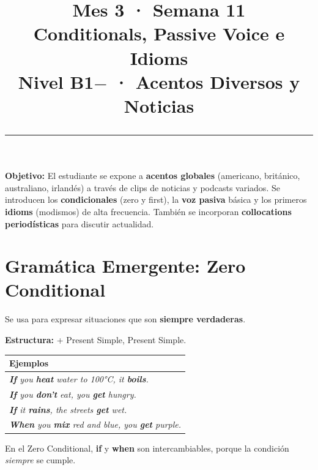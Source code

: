 \documentclass[12pt,a4paper]{article}
\title{%
  \vspace{-1cm}
  {\Huge\bfseries\textcolor{mes3}{Mes 3 · Semana 11}}\\[0.3cm]
  {\Large Conditionals, Passive Voice e Idioms}\\[0.2cm]
  {\large\color{grissuave} Nivel B1$-$ · Acentos Diversos y Noticias}\\[0.5cm]
  \rule{\textwidth}{1.5pt}
}
\author{}
\date{}
\begin{document}
\maketitle
\thispagestyle{empty}

\begin{cajanivel}
\textbf{Objetivo:} El estudiante se expone a \textbf{acentos globales} (americano, británico, australiano, irlandés) a través de clips de noticias y podcasts variados. Se introducen los \textbf{condicionales} (zero y first), la \textbf{voz pasiva} básica y los primeros \textbf{idioms} (modismos) de alta frecuencia. También se incorporan \textbf{collocations periodísticas} para discutir actualidad.
\end{cajanivel}

\section{Gramática Emergente: Zero Conditional}

\begin{cajagrammar}
Se usa para expresar situaciones que son \textbf{siempre verdaderas}.

\medskip
\textbf{Estructura:}  + Present Simple, Present Simple.

\begin{tabularx}{\textwidth}{@{} X @{}}
\toprule
\textbf{Ejemplos} \\
\midrule
\textit{\textbf{If} you \textbf{heat} water to 100°C, it \textbf{boils}.} \\
\textit{\textbf{If} you \textbf{don't} eat, you \textbf{get} hungry.} \\
\textit{\textbf{If} it \textbf{rains}, the streets \textbf{get} wet.} \\
\textit{\textbf{When} you \textbf{mix} red and blue, you \textbf{get} purple.} \\
\bottomrule
\end{tabularx}

\medskip
\begin{cajaejemplo}[Nota]
En el Zero Conditional, \textbf{if} y \textbf{when} son intercambiables, porque la condición \textit{siempre} se cumple.
\end{cajaejemplo}
\end{cajagrammar}
\end{document}
